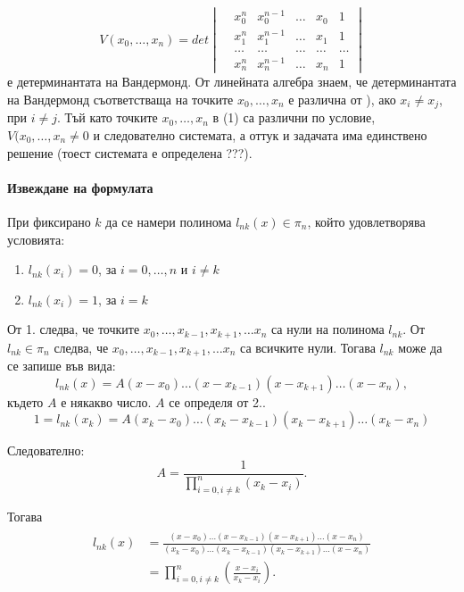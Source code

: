 \documentclass[12pt]{article}
\numberwithin{equation}{section}
\numberwithin{theorem}{section}
\numberwithin{definition}{section}
\numberwithin{corollary}{section}
\begin{document}
\[
V(x_0,\dotso,x_n) = det
\begin{vmatrix} 
&x_0^n &x_0^{n-1} &\dotso &x_0 &1\\
&x_1^n &x_1^{n-1} &\dotso &x_1 &1\\
&\dotso&\dotso&\dotso&\dotso&\dotso \\
&x_n^n &x_n^{n-1}&\dotso &x_n &1 
\end{vmatrix}
\]
е детерминантата на Вандермонд. От линейната алгебра знаем, че детерминантата на Вандермонд съответстваща на точките $x_0, \dotso , x_n$ е различна от ), ако $x_i \neq x_j$, при $i \neq j$. Тъй като точките $x_0, \dotso , x_n$ в (1) са различни по условие, $V(x_0, \dotso, x_n \neq 0$ и следователно системата, а оттук и задачата има единствено решение (тоест системата е определена ???).
\paragraph{Извеждане на формулата}
\par
При фиксирано $k$ да се намери полинома $l_{nk}(x)\in \pi_n$, който удовлетворява условията:
\begin{enumerate}
    \item $l_{nk}(x_i) = 0$, за $i = 0, \dotso, n$ и $i \neq k$
    \item $l_{nk}(x_i) = 1$, за $i = k$
\end{enumerate} 
\par
От 1. следва, че точките $x_0, \dotso, x_{k-1}, x_{k+1}, \dotso x_n$ са нули на полинома $l_{nk}$. От $l_{nk} \in \pi_n$ следва, че $x_0, \dotso, x_{k-1}, x_{k+1}, \dotso x_n$ са всичките нули. Тогава $l_{nk}$ може да се запише във вида:
\[
l_{nk}(x) = A(x - x_0)\dotso(x - x_{k-1})(x - x_{k+1})\dotso(x-x_n),
\]
където $A$ е някакво число. $A$ се определя от 2..
\[
1 = l_{nk}(x_k) = A(x_k - x_0)\dotso(x_k - x_{k-1})(x_k - x_{k+1})\dotso(x_k - x_n)
\]
\par
Следователно:
\[
A = \frac{1}{\displaystyle \prod_{i=0,i\neq k}^{n}(x_k-x_i)}.
\]
\par
Тогава
\begin{align}\label{e2}
\begin{split}
l_{nk}(x) &= \frac{(x - x_0)\dotso(x - x_{k-1})(x - x_{k+1})\dotso (x - x_n)}
{(x_k - x_0)\dotso(x_k - x_{k-1})(x_k - x_{k+1})\dotso(x - x_n)}\\ &= 
\displaystyle \prod_{i = 0, i \neq k}^n\left(\frac{x-x_i}{x_k - x_i}\right).
\end{split}
\end{align}
\par
\end{document}
